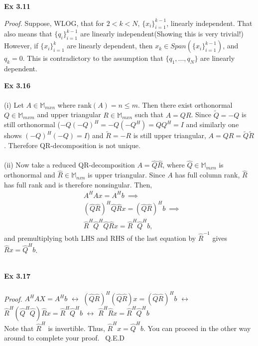 \documentclass[letterpaper,12pt]{article}
\theoremstyle{definition}
\begin{document}
\begin{spacing}{1.3}{}
	\setlength{\leftskip}{10pt}
	
	\textbf{Ex 3.11}
	
	\setlength{\leftskip}{20pt}
	
	\emph{Proof.} Suppose, WLOG, that for $2 < k < N$, $\{x_i \}_{i=1}^{k-1}$, linearly independent. That also means that $\{q_i\}_{i=1}^{k-1} $ are linearly independent(Showing this is very trivial!) \\
	However, if $\{x_i \}_{i=1}^{k}$ are linearly dependent, then $x_k \in Span(\{x_i \}_{i=1}^{k-1})$, and $q_k = 0$. This is contradictory to the assumption that $\{q_1, ..., q_N\}$ are linearly dependent.
	
	\setlength{\leftskip}{10pt}
	
	\textbf{Ex 3.16} \\\\
	(i)
	Let $A\in\mathbb M_{mxn}$ where $\text{rank}(A)=n\leq m$.
	Then there exist orthonormal $Q\in\mathbb M_{mxm}$ and
	upper triangular $R\in\mathbb M_{mxn}$ such that $A=QR$.
	Since $\tilde{Q}=-Q$ is still orthonormal ($-Q(-Q)^H=-Q(-Q^H)=QQ^H=I$
	and similarly one shows $(-Q)^H(-Q)=I$)
	and $\tilde{R}=-R$ is still upper triangular,
	$A=QR=\tilde{Q}\tilde{R}$.
	Therefore QR-decomposition is not unique. \\\\
	
	(ii)
	Now take a reduced QR-decomposition $A=\hat{Q}\hat{R}$,
	where $\hat{Q}\in\mathbb M_{mxn}$ is orthonormal and $\hat{R}\in\mathbb M_{nxn}$ is upper triangular.
	Since $A$ has full column rank, $\hat{R}$ has full rank and is therefore nonsingular.
	Then,
	\begin{align*}
	&A^HAx=A^Hb\ \implies\\
	&(\hat{Q}\hat{R})^H\hat{Q}\hat{R}x = (\hat{Q}\hat{R})^Hb\ \implies\\
	&\hat{R}^H\hat{Q}^H\hat{Q}\hat{R}x = \hat{R}^H\hat{Q}^Hb,
	\end{align*}
	and premultiplying both LHS and RHS of the last equation by $\hat{R}^{-1}$ gives
	$\hat{R}x = \hat{Q}^Hb$. \\\\
	
	\setlength{\leftskip}{10pt}
	
	\textbf{Ex 3.17} \\\\
	
	\setlength{\leftskip}{20pt}
	\emph{Proof.} $A^{H}AX = A^{H}b$ $\leftrightarrow$ $(\hat{Q} \hat{R})^{H} (\hat{Q} \hat{R}) x = (\hat{Q} \hat{R})^{H} b $ $\leftrightarrow$ $\hat{R}^{H} (\hat{Q}^{H} \hat{Q}) \hat{R} x = \hat{R}^{H} \hat{Q}^{H} b$ $\leftrightarrow$ $\hat{R}^{H} \hat{R} x = \hat{R}^{H} \hat{Q}^{H}b $ \\
	Note that $\hat{R}^{H}$ is invertible. Thus, $\hat{R}^{H} x = \hat{Q}^{H} b$. You can proceed in the other way around to complete your proof. \ Q.E.D \\\\
	

\end{spacing}
\end{document}
